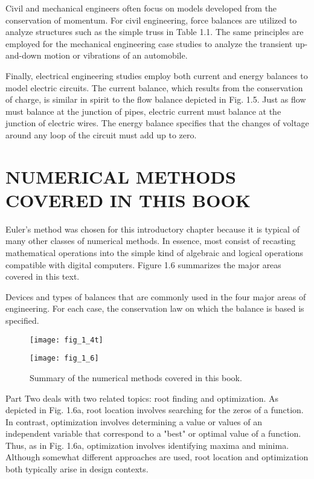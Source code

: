 \documentclass[../main.tex]{subfiles}
\begin{document}
Civil and mechanical engineers often focus on models developed from the conservation of momentum. For civil engineering, force balances are utilized to analyze structures
such as the simple truss in Table 1.1. The same principles are employed for the mechanical
engineering case studies to analyze the transient up-and-down motion or vibrations of an
automobile.

Finally, electrical engineering studies employ both current and energy balances to model
electric circuits. The current balance, which results from the conservation of charge, is similar in 
spirit to the flow balance depicted in Fig. 1.5. Just as flow must balance at the junction
of pipes, electric current must balance at the junction of electric wires. The energy balance
specifies that the changes of voltage around any loop of the circuit must add up to zero.



\section{NUMERICAL METHODS COVERED IN THIS BOOK}

Euler's method was chosen for this introductory chapter because it is typical of many other
classes of numerical methods. In essence, most consist of recasting mathematical operations 
into the simple kind of algebraic and logical operations compatible with digital computers.
 Figure 1.6 summarizes the major areas covered in this text. 
\begin{table}[H]
\caption{\textsf{Devices and types of balances that are commonly used in the four major areas of engineering. For
each case, the conservation law on which the balance is based is specified.}}
 \begin{figure}[H]
	\centering
	\texttt{[image: fig\_1\_4t]}
   
   \label{fig_1.}
\end{figure}
\end{table}


\begin{figure}[H]
	\centering
	\texttt{[image: fig\_1\_6]}
   \caption{\textsf{Summary of the numerical methods covered in this book.}}
   \label{fig_1.}
\end{figure}


Part Two deals with two related topics: root finding and optimization. As depicted in
Fig. 1.6a, root location involves searching for the zeros of a function. In contrast, optimization involves determining 
a value or values of an independent variable that correspond to a
"best" or optimal value of a function. Thus, as in Fig. 1.6a, optimization involves identifying maxima and minima.
 Although somewhat different approaches are used, root location
and optimization both typically arise in design contexts.
\end{document}
